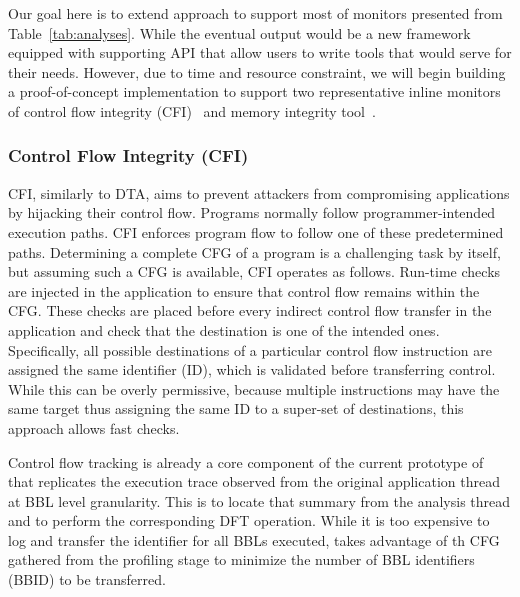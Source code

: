 Our goal here is to extend \sreplica approach to support most of monitors
presented from Table~\ref{tab:analyses}. While the eventual output would be a
new framework equipped with supporting API that allow users to write tools that
would serve for their needs. However, due to time and resource constraint, we
will begin building a proof-of-concept implementation to support two
representative inline monitors of control flow integrity (CFI)~\cite{cfi} and
memory integrity tool~\cite{memcheck, drmemory:cgo2011}.

\subsubsection{Control Flow Integrity (CFI)} 

CFI, similarly to DTA, aims to prevent attackers from compromising applications
by hijacking their control flow. Programs normally follow programmer-intended
execution paths. CFI enforces program flow to follow one of these predetermined
paths. Determining a complete CFG of a program is a challenging task by itself,
but assuming such a CFG is available, CFI operates as follows.  Run-time checks
are injected in the application to ensure that control flow remains within the
CFG. These checks are placed before every indirect control flow transfer in the
application and check that the destination is one of the intended ones.
Specifically, all possible destinations of a particular control flow instruction
are assigned the same identifier (ID), which is validated before transferring
control. While this can be overly permissive, because multiple instructions may
have the same target thus assigning the same ID to a super-set of destinations,
this approach allows fast checks. 

Control flow tracking is already a core component of the current prototype of
\sreplica that replicates the execution trace observed from the original
application thread at BBL level granularity. This is to locate that \tfa
summary from the analysis thread and to perform the corresponding DFT
operation.
%
While it is too expensive to log and transfer the identifier for all BBLs
executed, \sreplica takes advantage of th CFG gathered from the profiling stage
to minimize the number of BBL identifiers (BBID) to be transferred.

